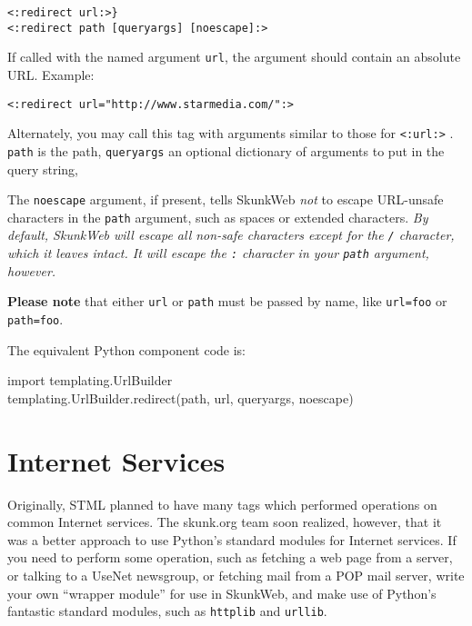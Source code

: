 \documentclass{manual}
\begin{document}
\begin{verbatim}
<:redirect url:>}
<:redirect path [queryargs] [noescape]:>
\end{verbatim}

If called with the named argument \texttt{url}, the argument
should contain an absolute URL. Example:

\begin{verbatim}<:redirect url="http://www.starmedia.com/":>\end{verbatim}

Alternately, you may call this tag with arguments
similar to those for 
\texttt{<:url:>} . 
\texttt{path} is the path, \texttt{queryargs} an optional
dictionary of arguments to put in the query string,


The \texttt{noescape} argument, if present,
tells SkunkWeb \emph{not} to escape URL-unsafe characters in the \texttt{path}
argument, such as spaces or extended characters. \emph{By default,
SkunkWeb will escape all non-safe characters except for the \texttt{/}
character, which it leaves intact. It will escape the \texttt{:}
character in your \texttt{path} argument, however.}


\textbf{Please note} that either \texttt{url} or \texttt{path}
must be passed by name, like \texttt{url=foo} or 
\texttt{path=foo}.



The equivalent Python component code is: 
\begin{obeylines}\ttfamily
import templating.UrlBuilder
templating.UrlBuilder.redirect(path, url, queryargs, noescape)
\end{obeylines}



\chapter{Internet Services}
\label{stmlrefnet}
Originally, STML planned to have many tags
which performed operations on common Internet services.
The skunk.org team soon realized, however, that
it was a better approach to use Python's standard
modules for Internet services. If you need to perform
some operation, such as fetching a web page from a server,
or talking to a UseNet newsgroup, or fetching mail
from a POP mail server, write your own ``wrapper module''
for use in SkunkWeb, and make use of Python's fantastic
standard modules, such as \texttt{httplib} and
\texttt{urllib}.
\end{document}
